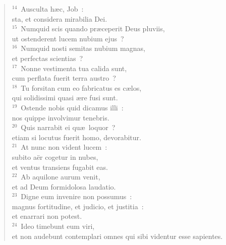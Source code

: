 \begin{flushleft}
\begin{verse}
${}^{14}$~Ausculta h\ae c, Job~:\\ sta, et considera mirabilia Dei.\\
${}^{15}$~Numquid scis quando pr\ae ceperit Deus pluviis,\\ ut ostenderent lucem nubium ejus~?\\
${}^{16}$~Numquid nosti semitas nubium magnas,\\ et perfectas scientias~?\\
${}^{17}$~Nonne vestimenta tua calida sunt,\\ cum perflata fuerit terra austro~?\\
${}^{18}$~Tu forsitan cum eo fabricatus es c\ae los,\\ qui solidissimi quasi \ae re fusi sunt.\\
${}^{19}$~Ostende nobis quid dicamus illi~:\\ nos quippe involvimur tenebris.\\
${}^{20}$~Quis narrabit ei qu\ae\ loquor~?\\ etiam si locutus fuerit homo, devorabitur.\\
${}^{21}$~At nunc non vident lucem~:\\ subito a\"er cogetur in nubes,\\ et ventus transiens fugabit eas.\\
${}^{22}$~Ab aquilone aurum venit,\\ et ad Deum formidolosa laudatio.\\
${}^{23}$~Digne eum invenire non possumus~:\\ magnus fortitudine, et judicio, et justitia~:\\ et enarrari non potest.\\
${}^{24}$~Ideo timebunt eum viri,\\ et non audebunt contemplari omnes qui sibi videntur esse sapientes.\end{verse}\end{flushleft}




